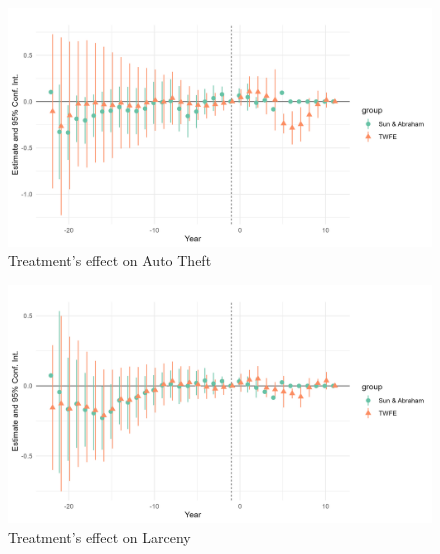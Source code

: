 \documentclass{article}
\begin{document}
\begin{figure}[H]
    \begin{center}
        \includegraphics[width=.85\textwidth]{figures/figure6.png}
    \end{center}
    \caption{Treatment's effect on Auto Theft}
    \label{fig:graph}
\end{figure}

\begin{figure}[H]
    \begin{center}
        \includegraphics[width=.85\textwidth]{figures/figure7.png}
    \end{center}
    \caption{Treatment's effect on Larceny}
    \label{fig:graph}
\end{figure}
\end{document}
